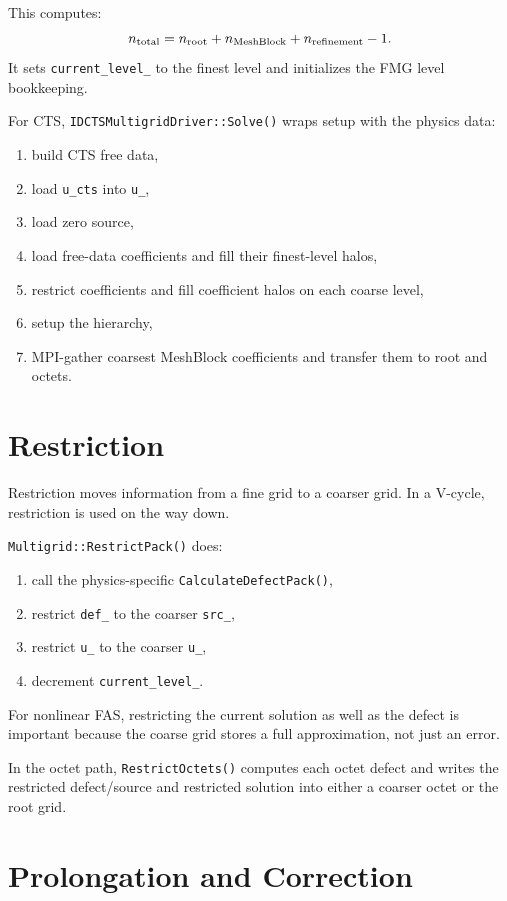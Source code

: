 \documentclass[11pt]{article}
\newcommand{\code}[1]{\texttt{#1}}
\begin{document}
This computes:
\[
  n_{\rm total} = n_{\rm root} + n_{\rm MeshBlock} + n_{\rm refinement} - 1.
\]
It sets \code{current\_level\_} to the finest level and initializes the FMG level
bookkeeping.

For CTS, \code{IDCTSMultigridDriver::Solve()} wraps setup with the physics data:
\begin{enumerate}
  \item build CTS free data,
  \item load \code{u\_cts} into \code{u\_},
  \item load zero source,
  \item load free-data coefficients and fill their finest-level halos,
  \item restrict coefficients and fill coefficient halos on each coarse level,
  \item setup the hierarchy,
  \item MPI-gather coarsest MeshBlock coefficients and transfer them to root and
        octets.
\end{enumerate}

\section{Restriction}

Restriction moves information from a fine grid to a coarser grid.  In a V-cycle,
restriction is used on the way down.

\code{Multigrid::RestrictPack()} does:
\begin{enumerate}
  \item call the physics-specific \code{CalculateDefectPack()},
  \item restrict \code{def\_} to the coarser \code{src\_},
  \item restrict \code{u\_} to the coarser \code{u\_},
  \item decrement \code{current\_level\_}.
\end{enumerate}

For nonlinear FAS, restricting the current solution as well as the defect is
important because the coarse grid stores a full approximation, not just an error.

In the octet path, \code{RestrictOctets()} computes each octet defect and writes
the restricted defect/source and restricted solution into either a coarser octet
or the root grid.

\section{Prolongation and Correction}
\end{document}
